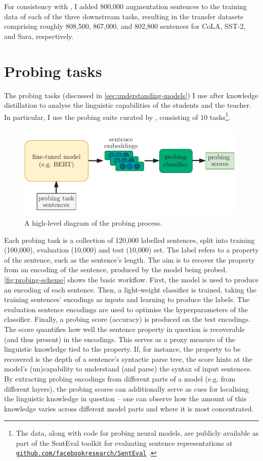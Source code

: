 \documentclass[bsc,frontabs,singlespacing,parskip,deptreport]{infthesis}
\newcommand\rurl[1]{%
  \href{https://#1}{\nolinkurl{#1}}%
}
\begin{document}
{{    For consistency with \citet{Tang_2019b}, I added 800,000 augmentation sentences to the training data of each of the three downstream tasks, resulting in the transfer datasets comprising roughly 808,500, 867,000, and 802,800 sentences for CoLA, SST-2, and Sara, respectively.
  }

  \section{Probing tasks}{
    \label{sec:probing-tasks}
    The probing tasks (discussed in \autoref{sec:understanding-models}) I use after knowledge distillation to analyse the linguistic capabilities of the students and the teacher. In particular, I use the probing suite curated by \citet{Conneau_2018}, consisting of 10 tasks\footnote{The data, along with code for probing neural models, are publicly available as part of the SentEval toolkit for evaluating sentence representations \citep{SentEval-paper} at \rurl{github.com/facebookresearch/SentEval}.}.

    \begin{figure}[h!t]
      \centering
      \includegraphics[width=11cm]{graphics/probing-scheme}
      \caption{A high-level diagram of the probing process.}
      \label{fig:probing-scheme}
    \end{figure}

    Each probing task is a collection of 120,000 labelled sentences, split into training (100,000), evaluation (10,000) and test (10,000) set. The label refers to a property of the sentence, such as the sentence's length. The aim is to recover the property from an encoding of the sentence, produced by the model being probed. \autoref{fig:probing-scheme} shows the basic workflow. First, the model is used to produce an encoding of each sentence. Then, a light-weight classifier is trained, taking the training sentences' encodings as inputs and learning to produce the labels. The evaluation sentence encodings are used to optimise the hyperparameters of the classifier. Finally, a probing score (accuracy) is produced on the test encodings. The score quantifies how well the sentence property in question is recoverable (and thus present) in the encodings. This serves as a proxy measure of the linguistic knowledge tied to the property. If, for instance, the property to be recovered is the depth of a sentence's syntactic parse tree, the score hints at the model's (un)capability to understand (and parse) the syntax of input sentences.
    By extracting probing encodings from different parts of a model (e.g. from different layers), the probing scores can additionally serve as cues for localising the linguistic knowledge in question -- one can observe how the amount of this knowledge varies across different model parts and where it is most concentrated.

}}
\end{document}
